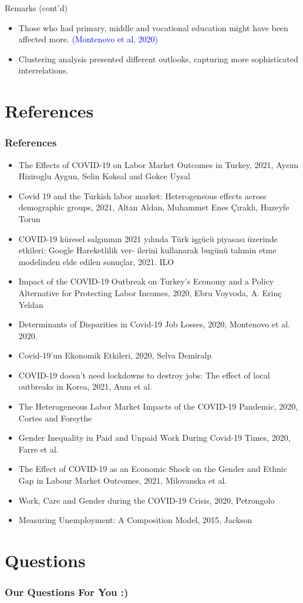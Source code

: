 \documentclass[
	11pt, %
]{beamer}
\begin{document}
\begin{frame}{Remarks (cont'd)}
\begin{itemize}
    \item Those who had primary, middle and vocational education might have been affected more. \textcolor{blue}{(Montenovo et al. 2020)}  
    \item Clustering analysis presented different outlooks, capturing more sophisticated interrelations.
    
\end{itemize}
    
\end{frame}


\section{References}
\begin{frame}
    \frametitle{References}
    \begin{itemize}
        \item The Effects of COVID-19 on Labor Market Outcomes in Turkey, 2021, Aysun Hiziroglu Aygun, Selin Koksal and Gokce Uysal
        \item Covid 19 and the Turkish labor market: Heterogeneous effects across demographic groups, 2021, Altan Aldan, Muhammet Enes Çıraklı, Huzeyfe Torun
        \item COVID-19 küresel salgınının 2021 yılında Türk işgücü piyasası üzerinde etkileri: Google Hareketlilik ver- ilerini kullanarak bugünü tahmin etme modelinden elde edilen sonuçlar, 2021. ILO
        \item Impact of the COVID-19 Outbreak on Turkey’s Economy and a Policy Alternative for Protecting Labor Incomes, 2020, Ebru Voyvoda, A. Erinç Yeldan
        \item Determinants of Disparities in Covid-19 Job Losses, 2020, Montenovo et al. 2020.
        \item Covid-19'un Ekonomik Etkileri, 2020, Selva Demiralp
    \end{itemize}
    
 
\end{frame}
\begin{itemize}
         \item COVID-19 doesn’t need lockdowns to destroy jobs: The effect of local outbreaks in Korea, 2021, Aum et al.
        \item The Heterogeneous Labor Market Impacts of the COVID-19 Pandemic, 2020, Cortes and Forsythe
        \item Gender Inequality in Paid and Unpaid Work During Covid-19 Times, 2020, Farre et al.
        \item The Effect of COVID-19 as an Economic Shock on the Gender and Ethnic Gap in Labour Market Outcomes, 2021, Milovanska et al.
        \item Work, Care and Gender during the COVID-19 Crisis, 2020, Petrongolo
        \item Measuring Unemployment: A Composition Model, 2015, Jackson
\end{itemize}


\section{Questions}
\begin{frame}
    \frametitle{Our Questions For You :)}
    
   
\end{frame}
\end{document}
